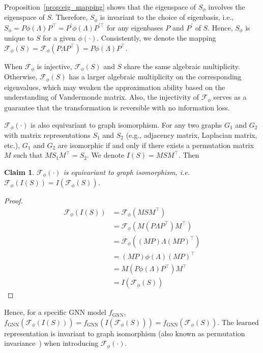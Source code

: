 \documentclass[nohyperref]{article}
\newtheorem{claim}{Claim}
\theoremstyle{plain}
\theoremstyle{definition}
\theoremstyle{remark}
\begin{document}
Proposition~\ref{prop:eig_mapping} shows that the eigenspace of $S_{\phi}$ involves the eigenspace of $S$.
Therefore, $S_{\phi}$ is invariant to the choice of eigenbasis, i.e., $S_{\phi}=P\phi(\Lambda)P^{\top}=P^{\prime}\phi(\Lambda)P^{\prime \top}$ for any eigenbases $P$ and $P^{\prime}$ of $S$.
Hence, $S_{\phi}$ is unique to $S$ for a given $\phi(\cdot)$.
Consistently, we denote the mapping $\mathcal F_{\phi}(S)=\mathcal F_{\phi}(P\Lambda P^{\top})=P\phi(\Lambda)P^{\top}$.

When $\mathcal F_{\phi}$ is injective, $\mathcal F_{\phi}(S)$ and $S$ share the same algebraic multiplicity.
Otherwise, $\mathcal F_{\phi}(S)$ has a larger algebraic multiplicity on the corresponding eigenvalues, which may weaken the approximation ability based on the understanding of Vandermonde matrix.
Also, the injectivity of $\mathcal F_{\phi}$ serves as a guarantee that the transformation is reversible with no information loss.

$\mathcal F_{\phi}(\cdot)$ is also equivariant to graph isomorphism.
For any two graphs $G_1$ and $G_2$ with matrix representations $S_1$ and $S_2$ (e.g., adjacency matrix, Laplacian matrix, etc.), $G_1$ and $G_2$ are isomorphic if and only if there exists a permutation matrix $M$ such that $MS_1 M^{\top}=S_2$.
We denote $I(S)=MSM^{\top}$.
Then
\begin{claim}
	$\mathcal F_{\phi}(\cdot)$ is equivariant to graph isomorphism, i.e. $\mathcal F_{\phi}(I(S))=I(\mathcal F_{\phi}(S))$.
\end{claim}
\begin{proof}
	\begin{equation}
		\nonumber
		\begin{aligned}
			\mathcal F_{\phi}(I(S))&=\mathcal F_{\phi}(MSM^{\top})\\
			&=\mathcal F_{\phi}(M(P\Lambda P^{\top})M^{\top})\\
			&=\mathcal F_{\phi}((MP)\Lambda(MP)^{\top})\\
			&=(MP)\phi(\Lambda)(MP)^{\top}\\
			&=M(P\phi(\Lambda)P^{\top})M^{\top}\\
			&=I(\mathcal F_{\phi}(S))
		\end{aligned}
	\end{equation}
\end{proof}
Hence, for a specific GNN model $f_{\textrm{GNN}}$, $f_{\textrm{GNN}}(\mathcal F_{\phi}(I(S)))=f_{\textrm{GNN}}(I(\mathcal F_{\phi}(S)))=f_{\textrm{GNN}}(\mathcal F_{\phi}(S))$.
The learned representation is invariant to graph isomorphism (also known as permutation invariance~\cite{NIPS2017_f22e4747,murphy2018janossy}) when introducing $\mathcal F_{\phi}(\cdot)$.
\end{document}
